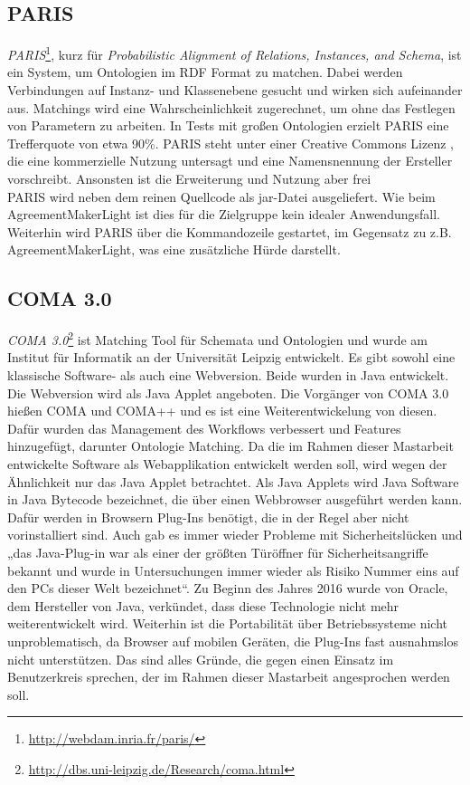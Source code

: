 		\subsection{PARIS}
		\textit{PARIS}\footnote{\url{http://webdam.inria.fr/paris/}}, kurz für
		\textit{Probabilistic Alignment of Relations, Instances, and Schema}, ist ein
		System, um Ontologien im RDF Format zu matchen. Dabei werden Verbindungen auf
		Instanz- und Klassenebene gesucht und wirken sich aufeinander aus. Matchings
		wird eine Wahrscheinlichkeit zugerechnet, um ohne das Festlegen von Parametern
		zu arbeiten. In Tests mit großen Ontologien erzielt PARIS eine Trefferquote von etwa 90\%. PARIS steht
		unter einer Creative Commons Lizenz , die eine kommerzielle Nutzung untersagt
		und eine Namensnennung der Ersteller vorschreibt. Ansonsten ist die
		Erweiterung und Nutzung aber frei\\
		PARIS wird neben dem reinen Quellcode als jar-Datei ausgeliefert. Wie beim
		AgreementMakerLight ist dies für die Zielgruppe kein idealer Anwendungsfall.
		Weiterhin wird PARIS über die Kommandozeile gestartet, im Gegensatz zu z.B.
		AgreementMakerLight, was eine zusätzliche Hürde darstellt.
		
		\subsection{COMA 3.0}
		\textit{COMA 3.0}\footnote{\url{http://dbs.uni-leipzig.de/Research/coma.html}}
		ist Matching Tool für Schemata und Ontologien und wurde am Institut für Informatik an der Universität Leipzig entwickelt. Es gibt sowohl
		eine klassische Software- als auch eine Webversion. Beide wurden in Java
		entwickelt. Die Webversion wird als Java Applet angeboten. Die Vorgänger von
		COMA 3.0 hießen COMA und COMA++ und es ist eine Weiterentwickelung von diesen.
		Dafür wurden das Management des Workflows verbessert und Features hinzugefügt,
		darunter Ontologie Matching. Da die im Rahmen dieser Mastarbeit entwickelte
		Software als Webapplikation entwickelt werden soll, wird wegen der Ähnlichkeit
		nur das Java Applet betrachtet. Als Java Applets wird Java Software in Java
		Bytecode bezeichnet, die über einen Webbrowser ausgeführt werden kann. Dafür
		werden in Browsern Plug-Ins benötigt, die in der Regel aber nicht
		vorinstalliert sind. Auch gab es immer wieder Probleme mit Sicherheitslücken
		und „das Java-Plug-in war als einer der größten Türöffner für
		Sicherheitsangriffe bekannt und wurde in Untersuchungen immer wieder als
		Risiko Nummer eins auf den PCs dieser Welt bezeichnet“\cite{Heise16}. Zu
		Beginn des Jahres 2016 wurde von Oracle, dem Hersteller von Java, verkündet, dass diese
		Technologie nicht mehr weiterentwickelt wird.  Weiterhin ist die Portabilität
		über Betriebssysteme nicht unproblematisch, da Browser auf mobilen Geräten,
		die Plug-Ins fast ausnahmslos nicht unterstützen.  Das sind alles Gründe, die
		gegen einen Einsatz im Benutzerkreis sprechen, der im Rahmen dieser Mastarbeit
		angesprochen werden soll.
		

